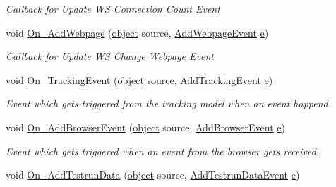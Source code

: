 \begin{DoxyCompactItemize}
\begin{DoxyCompactList}\small\item\em Callback for Update W\+S Connection Count Event \end{DoxyCompactList}\item 
void \hyperlink{class_web_analyzer_1_1_controller_1_1_test_controller_aac7dd97807dbc4bb9f7c8127b7f210e4}{On\+\_\+\+Add\+Webpage} (\hyperlink{_u_i_2_h_t_m_l_resources_2js_2lib_2underscore_8min_8js_aae18b7515bb2bc4137586506e7c0c903}{object} source, \hyperlink{class_web_analyzer_1_1_events_1_1_add_webpage_event}{Add\+Webpage\+Event} \hyperlink{_u_i_2_h_t_m_l_resources_2js_2lib_2bootstrap_8min_8js_ab5902775854a8b8440bcd25e0fe1c120}{e})
\begin{DoxyCompactList}\small\item\em Callback for Update W\+S Change Webpage Event \end{DoxyCompactList}\item 
void \hyperlink{class_web_analyzer_1_1_controller_1_1_test_controller_afd9f2518fa8375fbbb40b5267116316d}{On\+\_\+\+Tracking\+Event} (\hyperlink{_u_i_2_h_t_m_l_resources_2js_2lib_2underscore_8min_8js_aae18b7515bb2bc4137586506e7c0c903}{object} source, \hyperlink{class_web_analyzer_1_1_events_1_1_add_tracking_event}{Add\+Tracking\+Event} \hyperlink{_u_i_2_h_t_m_l_resources_2js_2lib_2bootstrap_8min_8js_ab5902775854a8b8440bcd25e0fe1c120}{e})
\begin{DoxyCompactList}\small\item\em Event which gets triggered from the tracking model when an event happend. \end{DoxyCompactList}\item 
void \hyperlink{class_web_analyzer_1_1_controller_1_1_test_controller_abc70d071b611a185c582588460ec25fe}{On\+\_\+\+Add\+Browser\+Event} (\hyperlink{_u_i_2_h_t_m_l_resources_2js_2lib_2underscore_8min_8js_aae18b7515bb2bc4137586506e7c0c903}{object} source, \hyperlink{class_web_analyzer_1_1_events_1_1_add_browser_event}{Add\+Browser\+Event} \hyperlink{_u_i_2_h_t_m_l_resources_2js_2lib_2bootstrap_8min_8js_ab5902775854a8b8440bcd25e0fe1c120}{e})
\begin{DoxyCompactList}\small\item\em Event which gets triggered when an event from the browser gets received. \end{DoxyCompactList}\item 
void \hyperlink{class_web_analyzer_1_1_controller_1_1_test_controller_a6108f3e3fdb88e99209d916b9d7d89d4}{On\+\_\+\+Add\+Testrun\+Data} (\hyperlink{_u_i_2_h_t_m_l_resources_2js_2lib_2underscore_8min_8js_aae18b7515bb2bc4137586506e7c0c903}{object} source, \hyperlink{class_web_analyzer_1_1_events_1_1_add_testrun_data_event}{Add\+Testrun\+Data\+Event} \hyperlink{_u_i_2_h_t_m_l_resources_2js_2lib_2bootstrap_8min_8js_ab5902775854a8b8440bcd25e0fe1c120}{e})

\end{DoxyCompactItemize}
